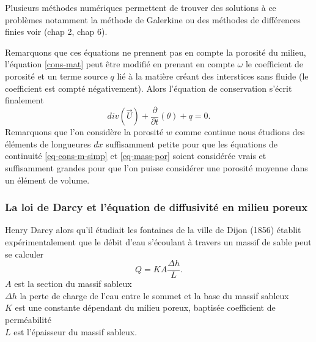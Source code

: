 \documentclass[a4paper,11pt]{article}
\begin{document}
Plusieurs méthodes numériques permettent de trouver des solutions à ce problèmes notamment la méthode de Galerkine ou des méthodes de différences finies voir \cite{allaire2005analyse} (chap 2, chap 6). 

\vspace{7mm}

Remarquons que ces équations ne prennent pas en compte la porosité du milieu, l'équation \eqref{cons-mat} peut être modifié en prenant en compte $\omega$ le coefficient de porosité et un terme source $q$ lié à la matière créant des interstices sans fluide (le coefficient est compté négativement). Alors l'équation de conservation s'écrit finalement
\begin{equation}
	\label{eq-mass-por}
	div(\overrightarrow{U})+\frac{\partial}{\partial t}(\theta)+ q=0.
\end{equation}
Remarquons que l'on considère la porosité $w$ comme continue nous étudions des éléments de longueures $dx$ suffisamment petite pour que les équations de continuité \eqref{eq-cons-m-simp} et \eqref{eq-mass-por} soient considérée vrais et suffisamment grandes pour que l'on puisse considérer une porosité moyenne dans un élément de volume.

\subsubsection{La loi de Darcy et l'équation de diffusivité en milieu poreux}
\label{Darcy}
Henry Darcy alors qu'il étudiait les fontaines de la ville de Dijon (1856) établit expérimentalement que le débit d'eau s'écoulant à travers un massif de sable peut se calculer
\begin{equation}
	Q=KA\frac{\Delta h}{L}.
\end{equation}
$A$ est la section du massif sableux\\
$\Delta h$ la perte de charge de l'eau entre le sommet et la base du massif sableux\\
$K$ est une constante dépendant du milieu poreux, baptisée coefficient de perméabilité\\
$L$ est l'épaisseur du massif sableux.
\end{document}
